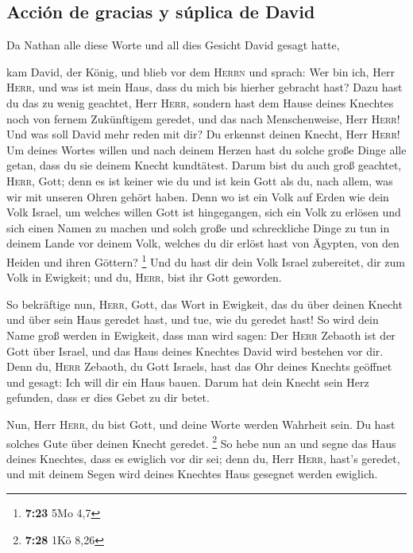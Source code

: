 \hypertarget{acciuxf3n-de-gracias-y-suxfaplica-de-david}{%
\subsection{Acción de gracias y súplica de
David}\label{acciuxf3n-de-gracias-y-suxfaplica-de-david}}

 Da Nathan alle diese Worte und all dies Gesicht David
gesagt hatte,

 kam David, der König, und blieb vor dem \textsc{Herrn}
und sprach: Wer bin ich, Herr \textsc{Herr}, und was ist mein Haus, dass
du mich bis hierher gebracht hast?  Dazu hast du das zu
wenig geachtet, Herr \textsc{Herr}, sondern hast dem Hause deines
Knechtes noch von fernem Zukünftigem geredet, und das nach
Menschenweise, Herr \textsc{Herr}!  Und was soll David
mehr reden mit dir? Du erkennst deinen Knecht, Herr \textsc{Herr}!
 Um deines Wortes willen und nach deinem Herzen hast du
solche große Dinge alle getan, dass du sie deinem Knecht kundtätest.
 Darum bist du auch groß geachtet, \textsc{Herr}, Gott;
denn es ist keiner wie du und ist kein Gott als du, nach allem, was wir
mit unseren Ohren gehört haben.  Denn wo ist ein Volk auf
Erden wie dein Volk Israel, um welches willen Gott ist hingegangen, sich
ein Volk zu erlösen und sich einen Namen zu machen und solch große und
schreckliche Dinge zu tun in deinem Lande vor deinem Volk, welches du
dir erlöst hast von Ägypten, von den Heiden und ihren Göttern?
\footnote{\textbf{7:23} 5Mo 4,7}  Und du hast dir dein
Volk Israel zubereitet, dir zum Volk in Ewigkeit; und du, \textsc{Herr},
bist ihr Gott geworden.

 So bekräftige nun, \textsc{Herr}, Gott, das Wort in
Ewigkeit, das du über deinen Knecht und über sein Haus geredet hast, und
tue, wie du geredet hast!  So wird dein Name groß werden
in Ewigkeit, dass man wird sagen: Der \textsc{Herr} Zebaoth ist der Gott
über Israel, und das Haus deines Knechtes David wird bestehen vor dir.
 Denn du, \textsc{Herr} Zebaoth, du Gott Israels, hast
das Ohr deines Knechts geöffnet und gesagt: Ich will dir ein Haus bauen.
Darum hat dein Knecht sein Herz gefunden, dass er dies Gebet zu dir
betet.

 Nun, Herr \textsc{Herr}, du bist Gott, und deine Worte
werden Wahrheit sein. Du hast solches Gute über deinen Knecht geredet.
\footnote{\textbf{7:28} 1Kö 8,26}  So hebe nun an und
segne das Haus deines Knechtes, dass es ewiglich vor dir sei; denn du,
Herr \textsc{Herr}, hast's geredet, und mit deinem Segen wird deines
Knechtes Haus gesegnet werden ewiglich.

